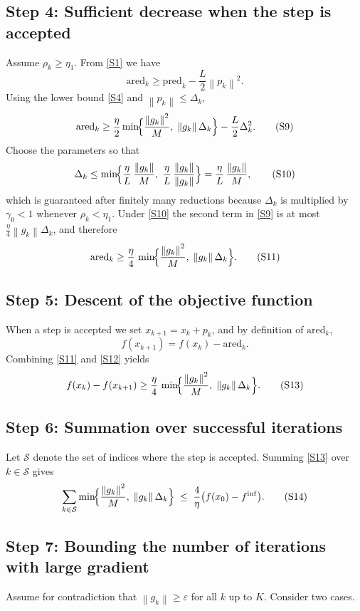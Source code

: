 \documentclass{article}
\newcommand{\norm}[1]{\left\lVert#1\right\rVert}
\begin{document}
\subsection*{Step 4: Sufficient decrease when the step is accepted}
Assume $\rho_{k}\ge\eta_{1}$.  From \eqref{S1} we have
\[
\text{ared}_{k}
\ge \text{pred}_{k}-\frac{L}{2}\norm{p_{k}}^{2}.
\tag{S8}
\]
Using the lower bound \eqref{S4} and $\norm{p_{k}}\le\Delta_{k}$,
\[
\text{ared}_{k}
\ge \frac{\eta}{2}\min\!\Bigl\{ \frac{\norm{g_{k}}^{2}}{M},\;
\norm{g_{k}}\Delta_{k}\Bigr\}
-\frac{L}{2}\Delta_{k}^{2}.
\tag{S9}
\]
Choose the parameters so that
\[
\Delta_{k}\le \min\!\Bigl\{\frac{\eta}{L}\,\frac{\norm{g_{k}}}{M},
\;\frac{\eta}{L}\,\frac{\norm{g_{k}}}{\norm{g_{k}}}\Bigr\}
= \frac{\eta}{L}\,\frac{\norm{g_{k}}}{M},
\tag{S10}
\]
which is guaranteed after finitely many reductions because $\Delta_{k}$ is multiplied by $\gamma_{0}<1$ whenever $\rho_{k}<\eta_{1}$.  Under \eqref{S10} the second term in \eqref{S9} is at most $\frac{\eta}{4}\norm{g_{k}}\Delta_{k}$, and therefore
\[
\text{ared}_{k}
\ge \frac{\eta}{4}\,\min\!\Bigl\{ \frac{\norm{g_{k}}^{2}}{M},\;
\norm{g_{k}}\Delta_{k}\Bigr\}.
\tag{S11}
\]

\subsection*{Step 5: Descent of the objective function}
When a step is accepted we set $x_{k+1}=x_{k}+p_{k}$, and by definition of $\text{ared}_{k}$,
\[
f(x_{k+1})=f(x_{k})-\text{ared}_{k}.
\tag{S12}
\]
Combining \eqref{S11} and \eqref{S12} yields
\[
f(x_{k})-f(x_{k+1})
\ge
\frac{\eta}{4}\,
\min\!\Bigl\{ \frac{\norm{g_{k}}^{2}}{M},\;
\norm{g_{k}}\Delta_{k}\Bigr\}.
\tag{S13}
\]

\subsection*{Step 6: Summation over successful iterations}
Let $\mathcal{S}$ denote the set of indices where the step is accepted.  Summing \eqref{S13} over $k\in\mathcal{S}$ gives
\[
\sum_{k\in\mathcal{S}}
\min\!\Bigl\{ \frac{\norm{g_{k}}^{2}}{M},\;
\norm{g_{k}}\Delta_{k}\Bigr\}
\;\le\;
\frac{4}{\eta}\bigl(f(x_{0})-f^{\inf}\bigr).
\tag{S14}
\]

\subsection*{Step 7: Bounding the number of iterations with large gradient}
Assume for contradiction that $\norm{g_{k}}\ge\varepsilon$ for all $k$ up to $K$.  Consider two cases.
\end{document}
